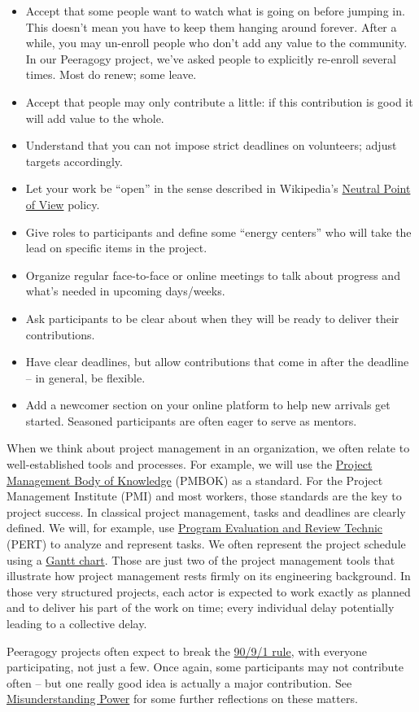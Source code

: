 \begin{itemize}
\item
  Accept that some people want to watch what is going on before jumping
  in. This doesn't mean you have to keep them hanging around forever.
  After a while, you may un-enroll people who don't add any value to the
  community. In our Peeragogy project, we've asked people to explicitly
  re-enroll several times. Most do renew; some leave.
\item
  Accept that people may only contribute a little: if this contribution
  is good it will add value to the whole.
\item
  Understand that you can not impose strict deadlines on volunteers;
  adjust targets accordingly.
\item
  Let your work be ``open'' in the sense described in Wikipedia's
  \href{http://en.wikipedia.org/wiki/Wikipedia:Neutral\_point\_of\_view}{Neutral
  Point of View} policy.
\item
  Give roles to participants and define some ``energy centers'' who will
  take the lead on specific items in the project.
\item
  Organize regular face-to-face or online meetings to talk about
  progress and what's needed in upcoming days/weeks.
\item
  Ask participants to be clear about when they will be ready to deliver
  their contributions.
\item
  Have clear deadlines, but allow contributions that come in after the
  deadline -- in general, be flexible.
\item
  Add a newcomer section on your online platform to help new arrivals
  get started. Seasoned participants are often eager to serve as
  mentors.
\end{itemize}
When we think about project management in an organization, we often
relate to well-established tools and processes. For example, we will use
the \href{http://www.pmi.org/PMBOK-Guide-and-Standards.aspx}{Project
Management Body of Knowledge} (PMBOK) as a standard. For the Project
Management Institute (PMI) and most workers, those standards are the key
to project success. In classical project management, tasks and deadlines
are clearly defined. We will, for example, use
\href{http://en.wikipedia.org/wiki/PERT}{Program Evaluation and Review
Technic} (PERT) to analyze and represent tasks. We often represent the
project schedule using a
\href{http://en.wikipedia.org/wiki/Gantt\_chart}{Gantt chart}. Those are
just two of the project management tools that illustrate how project
management rests firmly on its engineering background. In those very
structured projects, each actor is expected to work exactly as planned
and to deliver his part of the work on time; every individual delay
potentially leading to a collective delay.

Peeragogy projects often expect to break the
\href{http://en.wikipedia.org/wiki/1\%25\_rule\_\%28Internet\_culture\%29}{90/9/1
rule}, with everyone participating, not just a few. Once again, some
participants may not contribute often -- but one really good idea is
actually a major contribution. See
\href{http://peeragogy.org/practice/antipatterns/misunderstanding-power/}{Misunderstanding
Power} for some further reflections on these matters.
